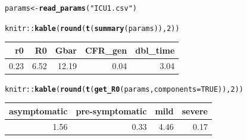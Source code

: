 \documentclass{article}\usepackage[]{graphicx}\usepackage[]{color}
\makeatletter
\newcommand{\hlnum}[1]{\textcolor[rgb]{0.686,0.059,0.569}{#1}}%
\newcommand{\hlstr}[1]{\textcolor[rgb]{0.192,0.494,0.8}{#1}}%
\newcommand{\hlopt}[1]{\textcolor[rgb]{0,0,0}{#1}}%
\newcommand{\hlstd}[1]{\textcolor[rgb]{0.345,0.345,0.345}{#1}}%
\newcommand{\hlkwb}[1]{\textcolor[rgb]{0.69,0.353,0.396}{#1}}%
\newcommand{\hlkwc}[1]{\textcolor[rgb]{0.333,0.667,0.333}{#1}}%
\newcommand{\hlkwd}[1]{\textcolor[rgb]{0.737,0.353,0.396}{\textbf{#1}}}%
\newenvironment{kframe}{%
 \def\at@end@of@kframe{}%
 \ifinner\ifhmode%
  \def\at@end@of@kframe{\end{minipage}}%
  \begin{minipage}{\columnwidth}%
 \fi\fi%
 \def\FrameCommand##1{\hskip\@totalleftmargin \hskip-\fboxsep
 \colorbox{shadecolor}{##1}\hskip-\fboxsep
     \hskip-\linewidth \hskip-\@totalleftmargin \hskip\columnwidth}%
 \MakeFramed {\advance\hsize-\width
   \@totalleftmargin\z@ \linewidth\hsize
   \@setminipage}}%
 {\par\unskip\endMakeFramed%
 \at@end@of@kframe}
\newenvironment{knitrout}{}{} %
\makeatother
\begin{document}
\begin{knitrout}
\color{fgcolor}\begin{kframe}
\begin{alltt}
\hlstd{params} \hlkwb{<-} \hlkwd{read_params}\hlstd{(}\hlstr{"ICU1.csv"}\hlstd{)}

\hlstd{knitr}\hlopt{::}\hlkwd{kable}\hlstd{(}\hlkwd{round}\hlstd{(}\hlkwd{t}\hlstd{(}\hlkwd{summary}\hlstd{(params)),}\hlnum{2}\hlstd{))}
\end{alltt}
\end{kframe}
\begin{tabular}{r|r|r|r|r}
\hline
r0 & R0 & Gbar & CFR\_gen & dbl\_time\\
\hline
0.23 & 6.52 & 12.19 & 0.04 & 3.04\\
\hline
\end{tabular}

\begin{kframe}\begin{alltt}
\hlstd{knitr}\hlopt{::}\hlkwd{kable}\hlstd{(}\hlkwd{round}\hlstd{(}\hlkwd{t}\hlstd{(}\hlkwd{get_R0}\hlstd{(params,} \hlkwc{components}\hlstd{=}\hlnum{TRUE}\hlstd{)),}\hlnum{2}\hlstd{))}
\end{alltt}
\end{kframe}
\begin{tabular}{r|r|r|r}
\hline
asymptomatic & pre-symptomatic & mild & severe\\
\hline
1.56 & 0.33 & 4.46 & 0.17\\
\hline
\end{tabular}


\end{knitrout}
\end{document}
